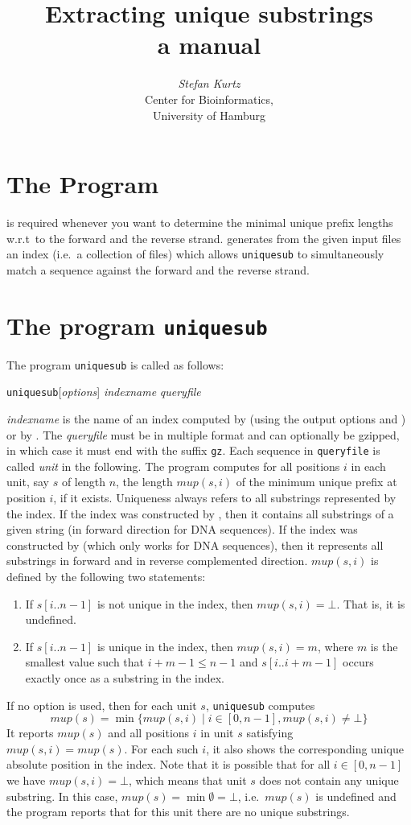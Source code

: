 \documentclass[12pt]{article}
\title{Extracting unique substrings\\
a manual}
\author{\begin{tabular}{c}
         \emph{Stefan Kurtz}\\
         Center for Bioinformatics,\\
         University of Hamburg
        \end{tabular}}
\newcommand{\Uniquesub}[0]{\texttt{uniquesub}\xspace}
\newcommand{\Mup}[1]{\mathit{mup(s,#1)}}
\newcommand{\Lmin}[0]{\mathit{mup(s)}}
\newcommand{\Substring}[3]{#1[#2..#3]}
\begin{document}
\maketitle
\section{The Program \MKRC}
\MKRC is required whenever you want to determine the minimal unique prefix
lengths w.r.t\ to the forward and the reverse strand.
\MKRC generates from the given input
files an index (i.e.\ a collection of files) which allows \Uniquesub to 
simultaneously match a sequence against the forward and the reverse strand.



\section{The program \Uniquesub}

The program \Uniquesub is called as follows:
\par
\noindent\Uniquesub [\emph{options}] \emph{indexname} \emph{queryfile}
\par
\emph{indexname} is the name of an index
computed by \MKV (using the output options  and
) or by \MKRC. The \emph{queryfile} must be in multiple 
\Fasta format and can optionally be gzipped, in which case it must end 
with the suffix \texttt{gz}.
Each sequence in \texttt{queryfile} is called \emph{unit} in the following.
The program computes for all positions \(i\) in each unit, say \(s\) of length
\(n\), the length \(\Mup{i}\) of the minimum unique prefix 
at position \(i\), if it exists. Uniqueness always refers to all substrings
represented by the index. If the index was constructed by \MKV, then
it contains all substrings of a given string (in forward direction for
DNA sequences). If the index was constructed by \MKRC (which only works
for DNA sequences), then it represents all substrings in forward and
in reverse complemented direction.
\(\Mup{i}\) is defined by the following two statements:
\begin{enumerate}
\item
If \(\Substring{s}{i}{n-1}\) is not unique in the index, then \(\Mup{i}=\bot\).
That is, it is undefined.
\item
If \(\Substring{s}{i}{n-1}\) is unique in the index, then \(\Mup{i}=m\), where 
\(m\) is the smallest value such that \(i+m-1\leq n-1\) and 
\(\Substring{s}{i}{i+m-1}\) occurs exactly once as a substring in the index.
\end{enumerate}
If no option is used, then for each unit \(s\), \Uniquesub computes 
\[\Lmin=\min\{\Mup{i}\mid i\in[0,n-1],\Mup{i}\neq\bot\}\]
It reports \(\Lmin\) and all positions \(i\) in unit \(s\)
satisfying \(\Mup{i}=\Lmin\). For each such \(i\), it also 
shows the corresponding unique absolute position in the index.
Note that it is possible that for all \(i\in[0,n-1]\) we have 
\(\Mup{i}=\bot\), which means that unit \(s\) does not contain any unique 
substring. In this case, \(\Lmin=\min\emptyset=\bot\), i.e.\ 
\(\Lmin\) is undefined and the program reports that for this unit there 
are no unique substrings.
\end{document}
